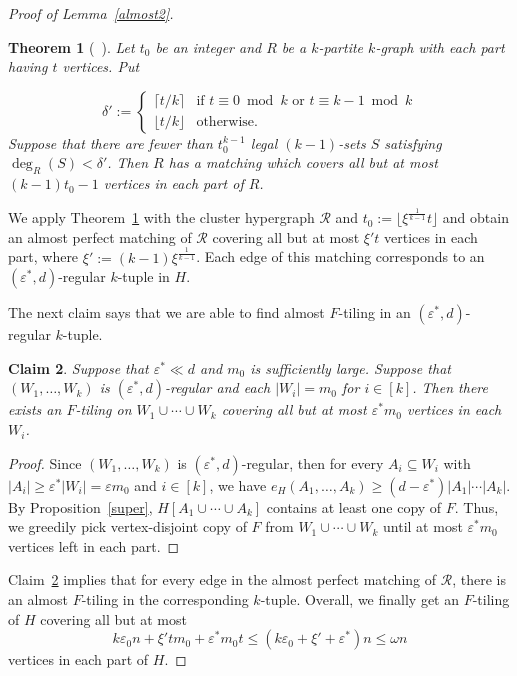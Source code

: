 \documentclass[11pt,a4paper]{article}
\newtheorem{thm}{Theorem}[section]
\newtheorem{claim}[thm]{Claim}
\theoremstyle{definition}
\begin{document}
\begin{proof}[Proof of Lemma~\ref{almost2}]
\begin{thm}[\rm{~\cite[Theorem 11]{KuhD}}]\label{almostPM}
    Let $t_0$ be an integer and $R$ be a $k$-partite $k$-graph with each part having $t$ vertices. Put

\[
\delta':= \begin{cases}
\lceil t/k \rceil&\text{if\ } 
t\equiv 0\bmod k\text{\ or\ }t\equiv k-1\bmod k\\
\lfloor t/k \rfloor&\text{otherwise}.
\end{cases}
\]
Suppose that there are fewer than $t_0^{k-1}$ legal $(k-1)$-sets $S$ satisfying $\deg_R(S)< \delta'$. Then $R$ has a matching which covers all but at most $(k-1)t_0-1$ vertices in each part of $R$.

\end{thm}

We apply Theorem~\ref{almostPM} with the cluster hypergraph $\mathcal{R}$ and $t_0:=\lfloor \xi^{\frac{1}{k-1}}t\rfloor$ and obtain an almost perfect matching of $\mathcal{R}$ covering all but at most $\xi't$ vertices in each part, where $\xi':=(k-1)\xi^{\frac{1}{k-1}}$. Each edge of this matching corresponds to an $(\varepsilon^*,d)$-regular $k$-tuple in $H$.

The next claim says that we are able to find almost $F$-tiling in an $(\varepsilon^*,d)$-regular $k$-tuple.

\begin{claim}\label{greedy}
   Suppose that $\varepsilon^*\ll d$ and $m_0$ is sufficiently large. Suppose that $(W_1,\dots ,W_k)$ is $(\varepsilon^*,d)$-regular and each $|W_i|=m_0$ for $i\in [k]$. Then there exists an $F$-tiling on $W_1\cup \cdots \cup W_k$ covering all but at most $\varepsilon^* m_0$ vertices in each $W_i$.
\end{claim}

\begin{proof}
    Since $(W_1,\dots ,W_k)$ is $(\varepsilon^*,d)$-regular, then for every $A_i\subseteq W_i$ with $|A_i|\geq \varepsilon^*|W_i|=\varepsilon m_0$ and $i\in [k]$, we have $e_H(A_1,\dots ,A_k)\geq (d-\varepsilon^*)|A_1|\cdots |A_k|$. By Proposition~\ref{super}, $H[A_1\cup \cdots \cup A_k]$ contains at least one copy of $F$. Thus, we greedily pick vertex-disjoint copy of $F$ from $W_1\cup \cdots \cup W_k$ until at most $\varepsilon^* m_0$ vertices left in each part.
\end{proof}

Claim~\ref{greedy} implies that for every edge in the almost perfect matching of $\mathcal{R}$, there is an almost $F$-tiling in the corresponding $k$-tuple. Overall, we finally get an $F$-tiling of $H$ covering all but at most
$$k\varepsilon_0n+
\xi'tm_0+\varepsilon^*m_0t\leq (k\varepsilon_0+\xi'+\varepsilon^*)n\leq \omega n$$
vertices in each part of $H$.



\end{proof}
\end{document}
